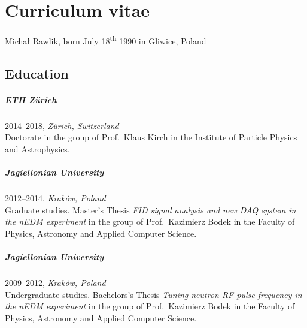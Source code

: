 



\manualmark
\markboth{\spacedlowsmallcaps{\bibname}}{\spacedlowsmallcaps{\bibname}} 


\begingroup

\let\clearpage\relax
\let\cleardoublepage\relax
\let\cleardoublepage\relax

\chapter*{Curriculum vitae} %

Michał Rawlik, born July 18\textsuperscript{th} 1990 in Gliwice, Poland

\section*{Education}
\paragraph{ETH Zürich} 2014--2018, \emph{Zürich, Switzerland}\\
Doctorate in the group of Prof.\ Klaus Kirch in the Institute of Particle Physics and Astrophysics.

\paragraph{Jagiellonian University} 2012--2014, \emph{Kraków, Poland}\\
Graduate studies. Master's Thesis \emph{FID signal analysis and new DAQ system in the nEDM experiment} in the group of Prof.\ Kazimierz Bodek in the
Faculty of Physics, Astronomy and Applied Computer Science.

\paragraph{Jagiellonian University} 2009--2012, \emph{Kraków, Poland}\\
Undergraduate studies. Bachelors's Thesis \emph{Tuning neutron RF-pulse frequency in the nEDM experiment} in the group of Prof.\ Kazimierz Bodek in the
Faculty of Physics, Astronomy and Applied Computer Science.

